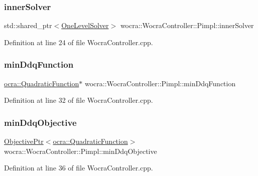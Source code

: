 \subsubsection{\texorpdfstring{inner\+Solver}{innerSolver}}
{\footnotesize\ttfamily std\+::shared\+\_\+ptr$<$\hyperlink{classocra_1_1OneLevelSolver}{One\+Level\+Solver}$>$ wocra\+::\+Wocra\+Controller\+::\+Pimpl\+::inner\+Solver}



Definition at line 24 of file Wocra\+Controller.\+cpp.

\hypertarget{structwocra_1_1WocraController_1_1Pimpl_aac1952b2ca7547f82d807089baa98f10}{}\label{structwocra_1_1WocraController_1_1Pimpl_aac1952b2ca7547f82d807089baa98f10} 
\subsubsection{\texorpdfstring{min\+Ddq\+Function}{minDdqFunction}}
{\footnotesize\ttfamily \hyperlink{classocra_1_1QuadraticFunction}{ocra\+::\+Quadratic\+Function}$\ast$ wocra\+::\+Wocra\+Controller\+::\+Pimpl\+::min\+Ddq\+Function}



Definition at line 32 of file Wocra\+Controller.\+cpp.

\hypertarget{structwocra_1_1WocraController_1_1Pimpl_a7fc80a10628bf0361a7c44d5bb659742}{}\label{structwocra_1_1WocraController_1_1Pimpl_a7fc80a10628bf0361a7c44d5bb659742} 
\subsubsection{\texorpdfstring{min\+Ddq\+Objective}{minDdqObjective}}
{\footnotesize\ttfamily \hyperlink{classocra_1_1ObjectivePtr}{Objective\+Ptr}$<$\hyperlink{classocra_1_1QuadraticFunction}{ocra\+::\+Quadratic\+Function}$>$ wocra\+::\+Wocra\+Controller\+::\+Pimpl\+::min\+Ddq\+Objective}



Definition at line 36 of file Wocra\+Controller.\+cpp.

